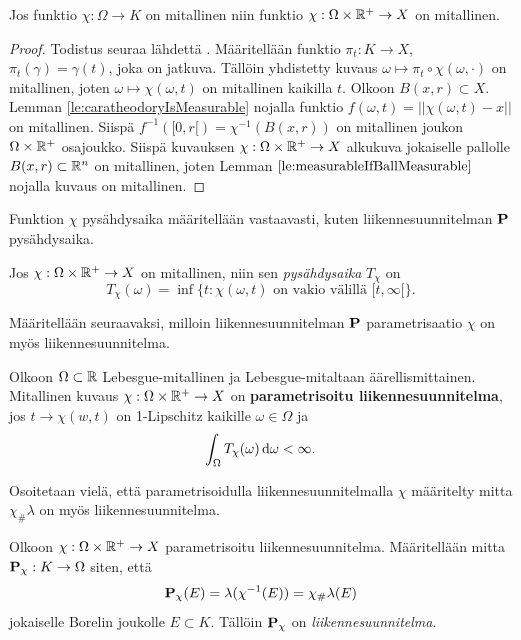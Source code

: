 \documentclass[12pt,oneside,a4paper]{amsbook} %
\begin{document}
\begin{lemma}\label{le:chiMeasurable}
    Jos funktio $ \chi: \Omega \to K$ on mitallinen niin funktio $\chi: \Omega \times \R^+ \to X $ on mitallinen.
\end{lemma}
\begin{proof}
Todistus seuraa lähdettä \cite[s. 27]{optimal}.
Määritellään funktio $\pi_t:K \to X$, $\pi_t(\gamma) = \gamma(t)$, joka on jatkuva. Tällöin yhdistetty kuvaus $\omega \mapsto \pi_t \circ \chi (\omega, \cdot)$ on mitallinen, joten $\omega \mapsto \chi(\omega, t)$ on mitallinen kaikilla $t$. Olkoon $B(x, r) \subset X$. Lemman \ref{le:caratheodoryIsMeasurable} nojalla funktio $f(\omega, t) = ||\chi(\omega, t) - x||$ on mitallinen. Siispä $f^{-1}([0,r[) = \chi^{-1}(B(x,r))$ on mitallinen joukon $\Omega \times \Rp$ osajoukko. Siispä kuvauksen $\chi:\Omega \times \Rp \to X $ alkukuva jokaiselle pallolle $B(x, r) \subset \R^n$ on mitallinen, joten Lemman $\ref{le:measurableIfBallMeasurable}$ nojalla kuvaus on mitallinen.
\end{proof}
Funktion $\chi$ pysähdysaika määritellään vastaavasti, kuten liikennesuunnitelman $\P$ pysähdysaika.
\begin{definition}
    Jos $\chi: \Omega \times \R^+ \to X$ on mitallinen, niin sen \textit{pysähdysaika} $T_\chi$ on
    \[T_\chi (\omega) = \inf\{t : \chi(\omega, t) \text{ on vakio välillä } [t,\infty[\}.\]
\end{definition}

Määritellään seuraavaksi, milloin liikennesuunnitelman $\P$ parametrisaatio $\chi$ on myös liikennesuunnitelma.
\begin{definition} \label{def:parameterizedTP}
    Olkoon $\Omega \subset \R$ Lebesgue-mitallinen ja Lebesgue-mitaltaan äärellismittainen. Mitallinen kuvaus $\chi: \Omega \times \R^+ \to X$ on \textbf{parametrisoitu liikennesuunnitelma}, jos $t\to \chi(w,t)$ on 1-Lipschitz kaikille $\omega \in \Omega$ ja
    \[\int_\Omega T_\chi (\omega) \, \d \omega < \infty .\]
\end{definition}


Osoitetaan vielä, että parametrisoidulla liikennesuunnitelmalla $\chi$ määritelty mitta $\chi_\#\lambda$ on myös liikennesuunnitelma.

\begin{theorem}
    Olkoon $\chi : \Omega \times \R^+ \to X$ parametrisoitu liikennesuunnitelma.
    Määritellään mitta $\P_\chi : K \to \Omega$ siten, että \[\P_\chi (E) = \lambda(\chi^{-1}(E)) = \chi_\#\lambda(E)\] jokaiselle Borelin joukolle $E\subset K$. 
    Tällöin $\P_\chi$ on \textit{liikennesuunnitelma}. 
\end{theorem}
\end{document}
